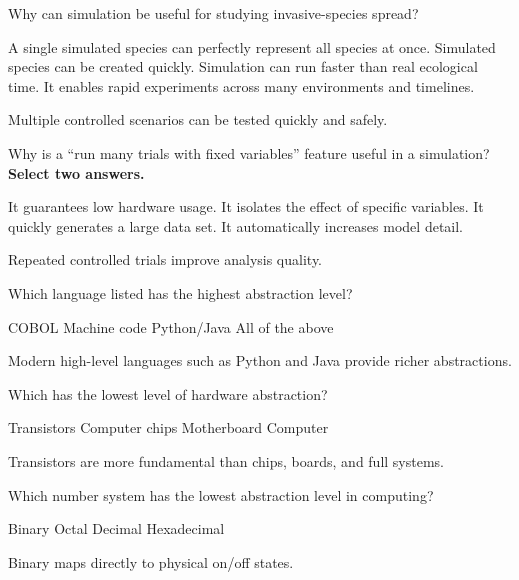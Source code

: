 \question[5]
Why can simulation be useful for studying invasive-species spread?
\begin{choices}
  \choice A single simulated species can perfectly represent all species at once.
  \choice Simulated species can be created quickly.
  \choice Simulation can run faster than real ecological time.
  \CorrectChoice It enables rapid experiments across many environments and timelines.
\end{choices}
\begin{solution}
  Multiple controlled scenarios can be tested quickly and safely.
\end{solution}

\newpage 

\question[5]
Why is a ``run many trials with fixed variables'' feature useful in a simulation? \textbf{Select two answers.}
\begin{checkboxes}
  \choice It guarantees low hardware usage.
  \CorrectChoice It isolates the effect of specific variables.
  \CorrectChoice It quickly generates a large data set.
  \choice It automatically increases model detail.
\end{checkboxes}
\begin{solution}
  Repeated controlled trials improve analysis quality.
\end{solution}

\question[5]
Which language listed has the highest abstraction level?
\begin{choices}
  \choice COBOL
  \choice Machine code
  \CorrectChoice Python/Java
  \choice All of the above
\end{choices}
\begin{solution}
  Modern high-level languages such as Python and Java provide richer abstractions.
\end{solution}

\question[5]
Which has the lowest level of hardware abstraction?
\begin{choices}
  \CorrectChoice Transistors
  \choice Computer chips
  \choice Motherboard
  \choice Computer
\end{choices}
\begin{solution}
  Transistors are more fundamental than chips, boards, and full systems.
\end{solution}

\question[5]
Which number system has the lowest abstraction level in computing?
\begin{choices}
  \CorrectChoice Binary
  \choice Octal
  \choice Decimal
  \choice Hexadecimal
\end{choices}
\begin{solution}
  Binary maps directly to physical on/off states.
\end{solution}

